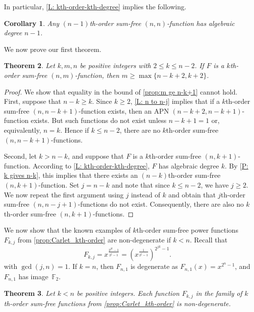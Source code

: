 \documentclass[12pt]{article}
\newtheorem{thm}{Theorem}[section]
\newtheorem{cor}[thm]{Corollary}
\theoremstyle{definition}
\newcommand{\F}{\mathbb F}
\begin{document}
In particular, \cref{L: kth-order-kth-degree} implies the following. 
\begin{cor}
    Any $(n-1)$th-order sum-free $(n,n)$-function has algebraic degree $n-1$.
\end{cor}

We now prove our first theorem.
 
\begin{thm} \label{T: m lower bound}
    Let $k, m, n$ be positive integers with $2 \leq k \leq n-2$. If $F$ is a $k$th-order sum-free $(n, m)$-function, then $m \ge \max\{n-k+2, k+2\}$. 
\end{thm}

\begin{proof} 
    We show that equality in the bound of \cref{prop:m ge n-k+1} cannot hold. First, suppose that $n -k \geq k$. Since $k \geq 2$, \cref{L: n to n-j} implies that if a $k$th-order sum-free $(n, n-k+1)$-function exists, then an APN $(n-k+2, n-k+1)$-function exists. But such functions do not exist unless $n - k + 1= 1$ or, equivalently, $n = k$. Hence if $k\le n-2$, there are no $k$th-order sum-free $(n, n-k+1)$-functions. 

    Second, let $k > n- k$, and suppose that $F$ is a $k$th-order sum-free $(n, k+1)$-function. According to \cref{L: kth-order-kth-degree}, $F$ has algebraic degree $k$. By \cref{P: k gives n-k}, this implies that there exists an $(n-k)$th-order sum-free $(n, k+1)$-function. Set $j = n - k$ and note that since $k \leq n-2$, we have $j \geq 2$. We now repeat the first argument using $j$ instead of $k$ and obtain that $j$th-order sum-free $(n, n-j+1)$-functions do not exist. Consequently, there are also no $k$th-order sum-free $(n, k+1)$-functions.
\end{proof}

We now show that the known examples of $k$th-order sum-free power functions $F_{k, j}$ from \cref{prop:Carlet_kth-order} are non-degenerate if $k<n$. Recall that 
    \[
    F_{k, j} = x^{\frac{2^{jk} - 1}{2^j-1}} = \left(x^{\frac{1}{2^j - 1}}\right)^{2^{jk}-1}.
    \]
    with $\gcd(j, n) = 1$. If $k=n$, then $F_{n,1}$ is degenerate as $F_{n,1}(x) = x^{2^n-1}$, and $F_{n,1}$ has image~$\F_2$.

\begin{thm}
\label{T: each Carlet function is nn}
  Let $k < n$ be positive integers. Each function $F_{k, j}$ in the family of $k$th-order sum-free functions from \cref{prop:Carlet_kth-order} is non-degenerate. 
\end{thm}
\end{document}
